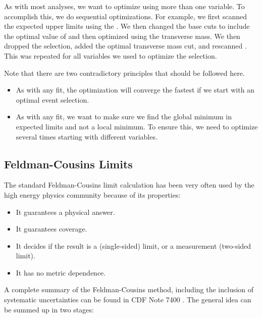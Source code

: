 As with most analyses, we want to optimize using more than one
variable.  To accomplish this, we do sequential optimizations.  For
example, we first scanned the expected upper limits using the \chisq.
We then changed the base cuts to include the optimal value of \chisq
and then optimized using the transverse mass.  We then dropped the
\chisq selection, added the optimal transverse mass cut, and rescanned
\chisq.  This was repeated for all variables we used to optimize the
selection.

Note that there are two contradictory principles that should be
followed here.

\begin{itemize}

  \item As with any fit, the optimization will converge the fastest if
    we start with an optimal event selection.

  \item As with any fit, we want to make sure we find the global
    minimum in expected limits and not a local minimum.  To ensure
    this, we need to optimize several times starting with different
    variables.

\end{itemize}

\subsection{Feldman-Cousins Limits}
\label{section:fclimits}

The standard Feldman-Cousins \cite{FeldmanCousins:1998fc} limit
calculation has been very often used by the high energy physics
community because of its properties:

\begin{itemize}

  \item It guarantees a physical answer.

  \item It guarantees coverage.

  \item It decides if the result is a (single-sided) limit, or a
    measurement (two-sided limit).

  \item It has no metric dependence.

\end{itemize}

A complete summary of the Feldman-Cousins method, including the
inclusion of systematic uncertainties can be found in CDF Note 7400
\cite{CDF7400}.  The general idea can be summed up in two stages:

